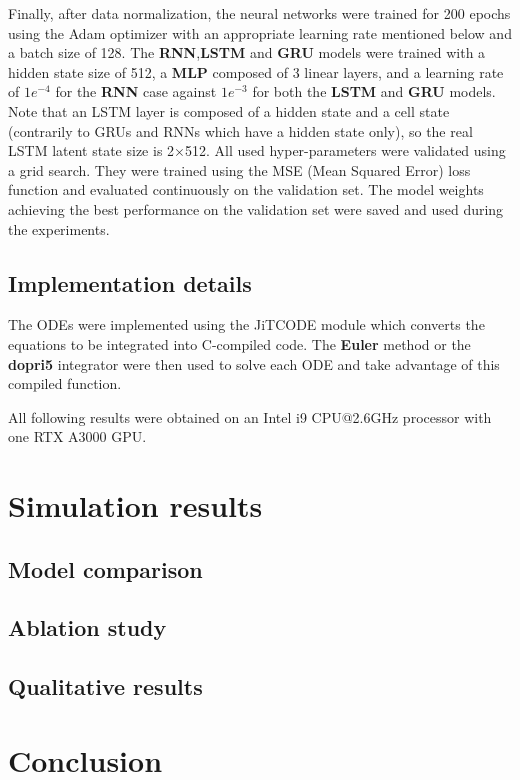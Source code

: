 Finally, after data normalization, the neural networks were trained for 200 epochs using the Adam optimizer \cite{kingma2014adam} with an appropriate learning rate mentioned below and a batch size of 128. 
The \textbf{RNN},\textbf{LSTM} and \textbf{GRU} models were trained with a hidden state size of 512, a \textbf{MLP} composed of 3 linear layers, and a learning rate of $1e^{-4}$ for the \textbf{RNN} case against $1e^{-3}$ for both the \textbf{LSTM} and \textbf{GRU} models.
Note that an LSTM layer is composed of a hidden state and a cell state (contrarily to GRUs and RNNs which have a hidden state only), so the real LSTM latent state size is 2$\times$512.
All used hyper-parameters were validated using a grid search.
They were trained using the MSE (Mean Squared Error) loss function and evaluated continuously on the validation set. 
The model weights achieving the best performance on the validation set were saved and used during the experiments.

\subsection{Implementation details}

The ODEs were implemented using the JiTCODE \cite{cJit} module which converts the equations to be integrated into C-compiled code.
The \textbf{Euler} method or the \textbf{dopri5} integrator were then used to solve each ODE and take advantage of this compiled function.


All following results were obtained on an Intel i9 CPU@2.6GHz processor with one RTX A3000 GPU. 

\section{Simulation results}
\subsection{Model comparison}\label{sec:nn_comparaison}
\subsection{Ablation study}
\subsection{Qualitative results}

\section{Conclusion} \label{sec:NN_concl}

\todomarker{}
